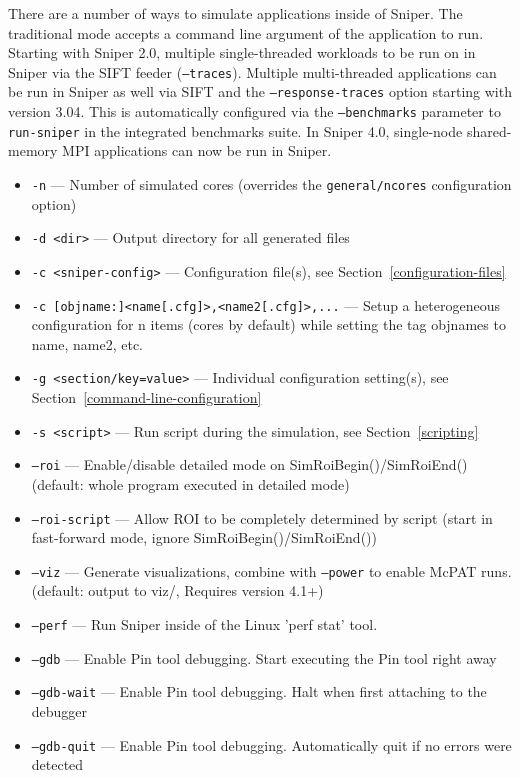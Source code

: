 \documentclass[a4paper,11pt,titlepage]{article}
\newcommand{\opt}[1]{{\tt #1}}
\begin{document}
There are a number of ways to simulate applications inside of Sniper.  The traditional mode accepts a command line argument
of the application to run. Starting with Sniper 2.0, multiple single-threaded
workloads to be run on in Sniper via the SIFT feeder (\opt{--traces}).
Multiple multi-threaded applications can be run in Sniper as well via SIFT and the \opt{--response-traces} option starting with version 3.04.
This is automatically configured via the \opt{--benchmarks} parameter to \opt{run-sniper} in the integrated benchmarks suite.
In Sniper 4.0, single-node shared-memory MPI applications can now be run in Sniper.

\begin{itemize}[label=$$]
\item \opt{-n} --- Number of simulated cores (overrides the \opt{general/ncores} configuration option)
\item \opt{-d <dir>} --- Output directory for all generated files
\item \opt{-c <sniper-config>} --- Configuration file(s), see Section~\ref{configuration-files}
\item \opt{-c [objname:]<name[.cfg]>,<name2[.cfg]>,...} --- Setup a heterogeneous configuration for n items (cores by default) while setting the tag objnames to name, name2, etc.
\item \opt{-g <section/key=value>} --- Individual configuration setting(s), see Section~\ref{command-line-configuration}
\item \opt{-s <script>} --- Run script during the simulation, see Section~\ref{scripting}
\item \opt{--roi} --- Enable/disable detailed mode on SimRoiBegin()/SimRoiEnd() (default: whole program executed in detailed mode)
\item \opt{--roi-script} --- Allow ROI to be completely determined by script (start in fast-forward mode, ignore SimRoiBegin()/SimRoiEnd())
\item \opt{--viz} --- Generate visualizations, combine with \opt{--power} to enable McPAT runs. (default: output to viz/, Requires version 4.1+)
\item \opt{--perf} --- Run Sniper inside of the Linux 'perf stat' tool.
\item \opt{--gdb} --- Enable Pin tool debugging. Start executing the Pin tool right away
\item \opt{--gdb-wait} --- Enable Pin tool debugging. Halt when first attaching to the debugger
\item \opt{--gdb-quit} --- Enable Pin tool debugging. Automatically quit if no errors were detected

\end{itemize}
\end{document}
